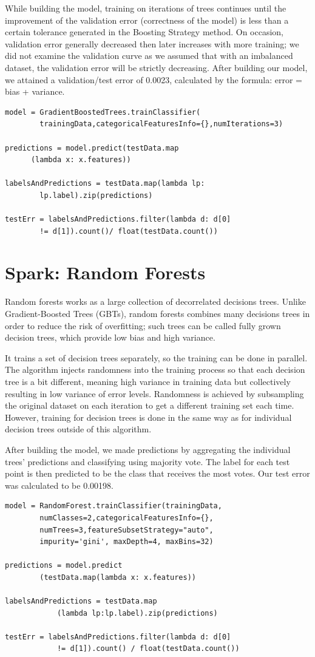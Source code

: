 \documentclass[9pt,twocolumn,twoside]{idsi}
\begin{document}
While building the model, training on iterations of trees continues until the improvement of the validation error (correctness of the model) is less than a certain tolerance generated in the Boosting Strategy method.  On occasion, validation error generally decreased then later increases with more training; we did not examine the validation curve as we assumed that with an imbalanced dataset, the validation error will be strictly decreasing. 
After building our model, we attained a validation/test error of 0.0023, calculated by the formula: error = bias + variance.


\begin{verbatim}
model = GradientBoostedTrees.trainClassifier(
		trainingData,categoricalFeaturesInfo={},numIterations=3)

predictions = model.predict(testData.map
      (lambda x: x.features)) 
      
labelsAndPredictions = testData.map(lambda lp:
        lp.label).zip(predictions)
        
testErr = labelsAndPredictions.filter(lambda d: d[0] 
		!= d[1]).count()/ float(testData.count())
\end{verbatim}
\section{Spark: Random Forests }
Random forests works as a large collection of decorrelated decisions trees. Unlike Gradient-Boosted Trees (GBTs), random forests combines many decisions trees in order to reduce the risk of overfitting; such trees can be called fully grown decision trees, which provide low bias and high variance.  

It trains a set of decision trees separately, so the training can be done in parallel. The algorithm injects randomness into the training process so that each decision tree is a bit different, meaning high variance in training data but collectively resulting in low variance of error levels. Randomness is achieved by subsampling the original dataset on each iteration to get a different training set each time. However, training for decision trees is done in the same way as for individual decision trees outside of this algorithm. 

After building the model, we made predictions by aggregating the individual trees’ predictions and classifying using majority vote. The label for each test point is then predicted to be the class that receives the most votes. Our test error was calculated to be 0.00198.
\begin{verbatim}
model = RandomForest.trainClassifier(trainingData, 
		numClasses=2,categoricalFeaturesInfo={},
        numTrees=3,featureSubsetStrategy="auto",
        impurity='gini', maxDepth=4, maxBins=32)

predictions = model.predict
		(testData.map(lambda x: x.features))
        
labelsAndPredictions = testData.map
			(lambda lp:lp.label).zip(predictions)

testErr = labelsAndPredictions.filter(lambda d: d[0] 
			!= d[1]).count() / float(testData.count())
\end{verbatim}
\end{document}
